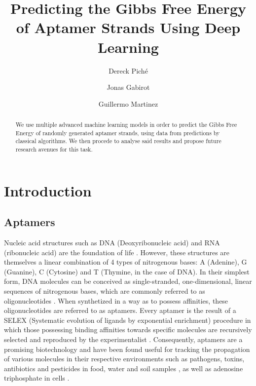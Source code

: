 \documentclass[11pt]{article}
\title{Predicting the Gibbs Free Energy of Aptamer Strands Using Deep Learning}
\author
{
    Dereck Piché \and
    Jonas Gabirot \and
    Guillermo Martinez\and
}
\begin{document}
\maketitle

\begin{abstract}
    We use multiple advanced machine learning models in order to predict the Gibbs Free Energy of randomly generated aptamer strands, using data from predictions by classical algorithms. We then procede to analyse said results and propose future research avenues for this task.
\end{abstract}

\section{Introduction}
\subsection{Aptamers}
Nucleic acid structures such as DNA (Deoxyribonucleic acid) and RNA (ribonucleic acid) are the foundation of life \cite{watson1953molecular}. However, these structures are themselves a linear combination of 4 types of nitrogenous bases: A (Adenine), G (Guanine), C (Cytosine) and T (Thymine, in the case of DNA). In their simplest form, DNA molecules can be conceived as single-stranded, one-dimensional, linear sequences of nitrogenous bases, which are commonly referred to as oligonucleotides \cite{alberts2002molecular}. When synthetized in a way as to possess affinities, these oligonucleotides are referred to as aptamers. Every aptamer is the result of a SELEX (Systematic evolution of ligands by exponential enrichment) procedure in which those possessing binding affinities towards specific molecules are recursively selected and reproduced by the experimentalist \cite{stoltenburg2021capture}. Consequently,  aptamers are a promising biotechnology and have been found useful for tracking the propagation of various molecules in their respective environments such as pathogens, toxins, antibiotics and pesticides in food, water and soil samples \cite{dunn2017analysis}, as well as adenosine triphosphate in cells \cite{zhang2019recent}.
\end{document}
